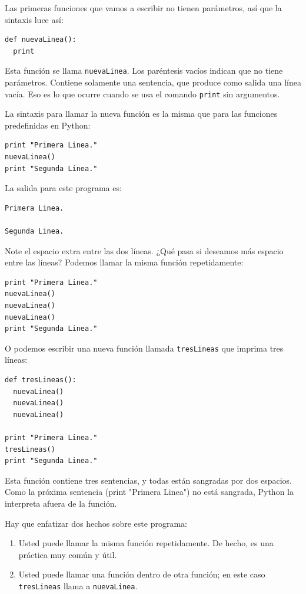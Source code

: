 Las primeras funciones que vamos a escribir no tienen parámetros, así que la
sintaxis luce así:

\beforeverb
\begin{verbatim}
def nuevaLinea():
  print
\end{verbatim}
\afterverb
%
Esta función se llama \texttt{nuevaLinea}.  Los paréntesis vacíos indican que no 
tiene parámetros. Contiene solamente una sentencia, que produce como salida
una línea vacía. Eso es lo que ocurre cuando se usa el comando \texttt{print}
sin argumentos.

La sintaxis para llamar la nueva función es la misma que para las funciones
predefinidas en Python:

\beforeverb
\begin{verbatim}
print "Primera Linea."
nuevaLinea()
print "Segunda Linea."
\end{verbatim}
\afterverb
%
La salida para este programa es:

\beforeverb
\begin{verbatim}
Primera Linea.

Segunda Linea.
\end{verbatim}
\afterverb
%
Note el espacio extra entre las dos líneas. ¿Qué pasa si deseamos 
más espacio entre las líneas? Podemos llamar la misma función 
repetidamente:

\beforeverb
\begin{verbatim}
print "Primera Linea."
nuevaLinea()
nuevaLinea()
nuevaLinea()
print "Segunda Linea."
\end{verbatim}
\afterverb
%
O podemos escribir una nueva función llamada \texttt{tresLineas} que imprima
tres líneas:

\beforeverb
\begin{verbatim}
def tresLineas():
  nuevaLinea()
  nuevaLinea()
  nuevaLinea()

print "Primera Linea."
tresLineas()
print "Segunda Linea."
\end{verbatim}
\afterverb
%
Esta función contiene tres sentencias, y todas están sangradas por dos espacios.
Como la próxima sentencia (print "Primera Linea") no está sangrada, Python la
interpreta afuera de la función.

Hay que enfatizar dos hechos sobre este programa:

\begin{enumerate}

\item Usted puede llamar la misma función repetidamente.  De hecho, es una práctica
muy común y útil.

\item Usted puede llamar una función dentro de otra función; en este caso
\texttt{tresLineas} llama a \texttt{nuevaLinea}.

\end{enumerate}

